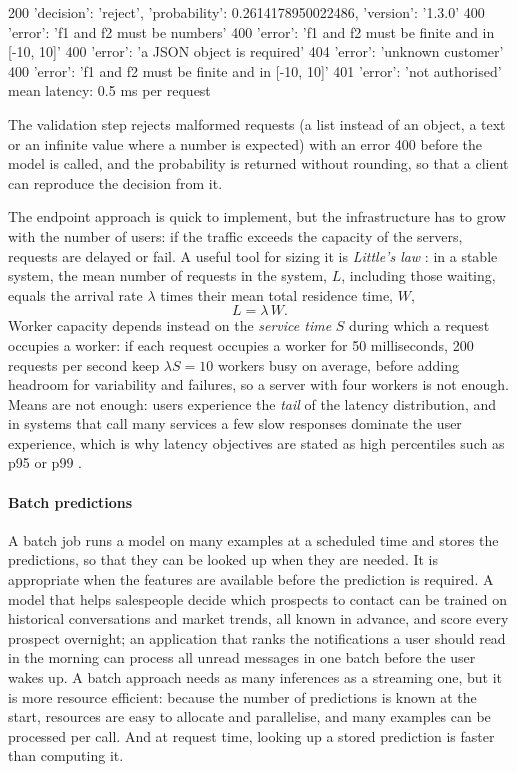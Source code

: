\begin{pyoutput}
200 {'decision': 'reject', 'probability': 0.2614178950022486, 'version': '1.3.0'}
400 {'error': 'f1 and f2 must be numbers'}
400 {'error': 'f1 and f2 must be finite and in [-10, 10]'}
400 {'error': 'a JSON object is required'}
404 {'error': 'unknown customer'}
400 {'error': 'f1 and f2 must be finite and in [-10, 10]'}
401 {'error': 'not authorised'}
mean latency: 0.5 ms per request
\end{pyoutput}

The validation step rejects malformed requests (a list instead of an object, a text or an infinite value
where a number is expected) with an error 400 before the model is called, and the probability is
returned without rounding, so that a client can reproduce the decision from it.

The endpoint approach is quick to implement, but the infrastructure has to grow with the number of
users: if the traffic exceeds the capacity of the servers, requests are delayed or fail. A useful tool
for sizing it is \emph{Little's law} \citep{little1961proof}: in a stable system, the mean number of
requests in the system, $L$, including those waiting, equals the arrival rate $\lambda$ times their mean total
residence time, $W$,
\begin{equation}\label{eq:little}
  L=\lambda\,W .
\end{equation}
Worker capacity depends instead on the \emph{service time} $S$ during which a request occupies a worker: if each request
occupies a worker for 50 milliseconds, 200 requests per second keep $\lambda S=10$ workers busy on average, before adding
headroom for variability and failures, so a server with four workers is not enough. Means are not enough: users
experience the \emph{tail} of the latency distribution, and in systems that call many services a few
slow responses dominate the user experience, which is why latency objectives are stated as high
percentiles such as p95 or p99 \citep{dean2013tail}.

\paragraph{Batch predictions} A batch job runs a model on many examples at a scheduled time and stores
the predictions, so that they can be looked up when they are needed. It is appropriate when the
features are available before the prediction is required. A model that helps salespeople decide which
prospects to contact can be trained on historical conversations and market trends, all known in
advance, and score every prospect overnight; an application that ranks the notifications a user
should read in the morning can process all unread messages in one batch before the user wakes up. A
batch approach needs as many inferences as a streaming one, but it is more resource efficient:
because the number of predictions is known at the start, resources are easy to allocate and
parallelise, and many examples can be processed per call. And at request time, looking up a stored
prediction is faster than computing it.

